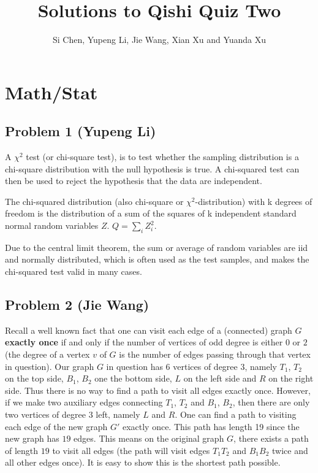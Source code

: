 \documentclass[10pt]{article}
\begin{document}
\title{Solutions to Qishi Quiz Two}
\author{Si Chen, Yupeng Li, Jie Wang, Xian Xu and Yuanda Xu}
\maketitle

\section{Math/Stat}

\subsection*{Problem 1 (Yupeng Li)}
A $\chi ^{2}$ test (or chi-square test), is to test whether the sampling distribution is a chi-square distribution with the null hypothesis is true.
A chi-squared test can then be used to reject the hypothesis that the data are independent.

The chi-squared distribution (also chi-square
or $\chi ^{2}$-distribution) with k degrees of freedom is the distribution of a sum of the squares of k independent standard normal random variables
$Z$. $Q =\sum _{i}Z_{i}^{2}$.

Due to the central limit theorem, the sum or average of random variables are iid and normally distributed, which
is often used as the test samples, and makes the chi-squared test valid in many cases.

\subsection*{Problem 2 (Jie Wang)}
Recall a well known fact that one can visit each edge of a (connected) graph $G$ \textbf{exactly once} if and only if the number of vertices of odd degree is either $0$ or $2$ (the degree of a vertex $v$ of $G$ is the number of edges passing through that vertex in question). Our graph $G$ in question has $6$ vertices of degree $3$, namely $T_{1}$, $T_{2}$ on the top side, $B_{1}$, $B_{2}$ one the bottom side, $L$ on the left side and $R$ on the right side. Thus there is no way to find a path to visit all edges exactly once. However, if we make two auxiliary edges
connecting $T_{1}$, $T_{2}$ and $B_{1}$, $B_{2}$, then there are only two vertices of degree $3$ left, namely $L$ and $R$. One can find a path to visiting each edge of the new graph $G \prime $ exactly once. This path has length 19 since the new graph has $19$ edges. This means on the original graph $G$, there exists a path of length $19$ to visit all edges (the path will visit edges $T_{1} T_{2}$ and $B_{1} B_{2}$ twice and all other edges once). It is easy to show this is the shortest path possible.
\end{document}
